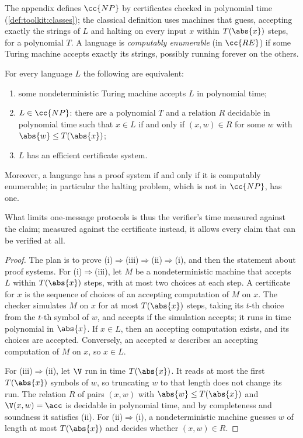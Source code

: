 \begin{refsection}
The appendix defines $\cc{NP}$ by certificates checked in polynomial time (\cref{def:toolkit:classes}); the classical definition uses machines that guess, accepting exactly the strings of $L$ and halting on every input $x$ within $T(\abs{x})$ steps, for a polynomial $T$. A language is \emph{computably enumerable} (in $\cc{RE}$) if some Turing machine accepts exactly its strings, possibly running forever on the others.

\begin{theorem}\label{thm:certificates:np}
For every language $L$ the following are equivalent:
\begin{enumerate}
\item some nondeterministic Turing machine accepts $L$ in polynomial time;
\item $L\in\cc{NP}$: there are a polynomial $T$ and a relation $R$ decidable in polynomial time such that $x\in L$ if and only if $(x,w)\in R$ for some $w$ with $\abs{w}\le T(\abs{x})$;
\item $L$ has an efficient certificate system.
\end{enumerate}
Moreover, a language has a proof system if and only if it is computably enumerable; in particular the halting problem, which is not in $\cc{NP}$, has one.
\end{theorem}

What limits one-message protocols is thus the verifier's time measured against the claim; measured against the certificate instead, it allows every claim that can be verified at all.

\begin{proof}
The plan is to prove (i)$\Rightarrow$(iii)$\Rightarrow$(ii)$\Rightarrow$(i), and then the statement about proof systems. For (i)$\Rightarrow$(iii), let $M$ be a nondeterministic machine that accepts $L$ within $T(\abs{x})$ steps, with at most two choices at each step. A certificate for $x$ is the sequence of choices of an accepting computation of $M$ on $x$. The checker simulates $M$ on $x$ for at most $T(\abs{x})$ steps, taking its $t$-th choice from the $t$-th symbol of $w$, and accepts if the simulation accepts; it runs in time polynomial in $\abs{x}$. If $x\in L$, then an accepting computation exists, and its choices are accepted. Conversely, an accepted $w$ describes an accepting computation of $M$ on $x$, so $x\in L$.

For (iii)$\Rightarrow$(ii), let $\V$ run in time $T(\abs{x})$. It reads at most the first $T(\abs{x})$ symbols of $w$, so truncating $w$ to that length does not change its run. The relation $R$ of pairs $(x,w)$ with $\abs{w}\le T(\abs{x})$ and $\V(x,w)=\acc$ is decidable in polynomial time, and by completeness and soundness it satisfies (ii). For (ii)$\Rightarrow$(i), a nondeterministic machine guesses $w$ of length at most $T(\abs{x})$ and decides whether $(x,w)\in R$.


\end{proof}
\end{refsection}
